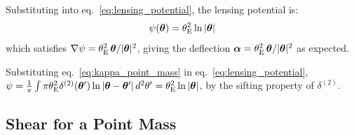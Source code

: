Substituting into eq.~\eqref{eq:lensing_potential}, the lensing
potential is:
\begin{equation}
    \psi(\boldsymbol{\theta}) = \theta_{\mathrm{E}}^2 \ln|\boldsymbol{\theta}|
    \label{eq:psi_point_mass}
\end{equation}
which satisfies $\nabla\psi = \theta_{\mathrm{E}}^2\, \boldsymbol{\theta}/|\boldsymbol{\theta}|^2$,
giving the deflection $\boldsymbol{\alpha} = \theta_{\mathrm{E}}^2\,\boldsymbol{\theta}/|\boldsymbol{\theta}|^2$
as expected.
\begin{derivation}
Substituting eq.~\eqref{eq:kappa_point_mass} in eq.~\eqref{eq:lensing_potential},
$\psi = \frac{1}{\pi}\int\pi\theta_{\mathrm{E}}^2\delta^{(2)}(\boldsymbol{\theta}')\ln|\boldsymbol{\theta} - \boldsymbol{\theta}'|\,d^2\theta'
= \theta_{\mathrm{E}}^2\ln|\boldsymbol{\theta}|$, by the sifting property of $\delta^{(2)}$.
\end{derivation}

\subsection{Shear for a Point Mass}

